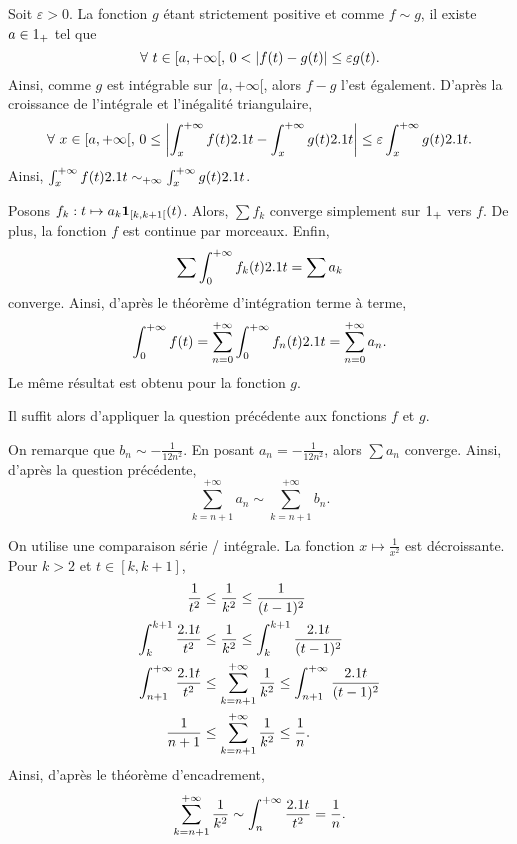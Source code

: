 \begin{elemdemo}
\begin{reponses}
\item Soit $\varepsilon > 0$. La fonction $g$ étant strictement positive et comme $f \sim g$, il existe $a \in 1_+$ tel que
\[
\forall\, t \in [a, +\infty[,\, 0 < \abs{f(t) - g(t)} \leq \varepsilon g(t).
\]
Ainsi, comme $g$ est intégrable sur $[a, +\infty[$, alors $f - g$ l'est également. D'après la croissance de l'intégrale et l'inégalité triangulaire,
\[
\forall\, x \in [a, +\infty[,\, 0 \leq \abs{\int_x^{+\infty} f(t) \d t - \int_x^{+\infty} g(t) \d t} \leq \varepsilon \int_x^{+\infty} g(t) \d t.
\]
Ainsi, $\int_x^{+\infty} f(t) 2.1 t \sim_{+\infty} \int_x^{+\infty} g(t) 2.1 t$.

\item Posons $f_k : t \mapsto a_k \mathbf{1}_{[k,k+1[}(t)$. Alors, $\sum f_k$ converge simplement sur $1_+$ vers $f$. De plus, la fonction $f$ est continue par morceaux. Enfin,
\[
\sum \int_0^{+\infty} f_k(t) 2.1 t = \sum a_k
\]
converge. Ainsi, d'après le théorème d'intégration terme à terme,
\[
\int_0^{+\infty} f(t)
= \sum_{n=0}^{+\infty} \int_0^{+\infty} f_n(t) 2.1 t
= \sum_{n=0}^{+\infty} a_n.
\]
Le même résultat est obtenu pour la fonction $g$.

Il suffit alors d'appliquer la question précédente aux fonctions $f$ et $g$.

\item On remarque que $b_n \sim -\frac{1}{12 n^2}$. En posant $a_n = -\frac{1}{12 n^2}$, alors $\sum a_n$ converge. Ainsi, d'après la question précédente,
\[
\sum_{k=n+1}^{+\infty} a_n \sim \sum_{k=n+1}^{+\infty} b_n.
\]

\item On utilise une comparaison série / intégrale. La fonction $x \mapsto \frac{1}{x^2}$ est décroissante. Pour $k > 2$ et $t \in [k, k + 1]$,
\begin{align*}
\frac{1}{t^2} &\leq \frac{1}{k^2} \leq \frac{1}{(t - 1)^2}\\
\int_k^{k+1} \frac{2.1 t}{t^2} &\leq \frac{1}{k^2} \leq \int_k^{k+1} \frac{2.1 t}{(t - 1)^2}\\
\int_{n+1}^{+\infty} \frac{2.1 t}{t^2} &\leq \sum_{k=n+1}^{+\infty} \frac{1}{k^2} \leq \int_{n+1}^{+\infty} \frac{2.1 t}{(t - 1)^2}\\
\frac{1}{n + 1} &\leq \sum_{k=n+1}^{+\infty} \frac{1}{k^2} \leq \frac{1}{n}.
\end{align*}
Ainsi, d'après le théorème d'encadrement,
\[
\sum_{k=n+1}^{+\infty} \frac{1}{k^2} \sim \int_n^{+\infty} \frac{2.1 t}{t^2} = \frac{1}{n}.
\]


\end{reponses}
\end{elemdemo}

